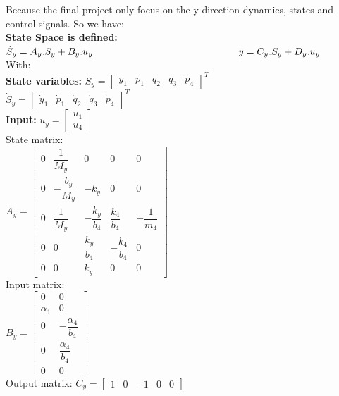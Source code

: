 \documentclass[14pt,a4paper]{article}
\begin{document}
\label{Problems}
\doublespacing
	Because the final project only focus on the y-direction dynamics, states and control signals. So we have:\\
	\textbf{State Space is defined:} \\
	\hspace*{5cm}	$\dot{S}_y = A_y.S_y + B_y.u_y \\
	\hspace*{5.2cm}		y = C_y.S_y + D_y.u_y $ \\
	With: \\
	\textbf{State variables:}  $S_y = {\begin{bmatrix} y_1&p_1&q_2&q_3&p_4 \end{bmatrix}}^T $ \\
	\hspace*{3.3cm} $\dot{S}_y = {\begin{bmatrix} \dot{y}_1 & \dot{p}_1 & \dot{q}_2 &\dot{q}_3 & \dot{p}_4 \end{bmatrix}}^T $ \\
	\textbf{Input:} $ u_y = \begin{bmatrix} u_1 \\ u_4 \end{bmatrix} $ \\
	State matrix:\\
	\hspace*{2cm} $ A_y = \begin{bmatrix} 0& \dfrac{1}{M_y} & 0&0&0 \\ 0& -\dfrac{b_y}{M_y} & -k_y&0&0 \\ 0& \dfrac{1}{M_y} & -\dfrac{k_y}{b_4} & \dfrac{k_4}{b_4} & -\dfrac{1}{m_4} \\ 0&0& \dfrac{k_y}{b_4} & -\dfrac{k_4}{b_4} &0 \\ 0&0& k_y &0&0 \end{bmatrix}$ \\
	Input matrix: \\
	\hspace*{2cm} $ B_y = \begin{bmatrix} 0&0 \\ \alpha_1 &0 \\ 0& -\dfrac{\alpha_4}{b_4} \\ 0& \dfrac{\alpha_4}{b_4} \\ 0&0 \end{bmatrix} $\\
	Output matrix: \hspace{1cm}	$ C_y = \begin{bmatrix} 1& 0& -1& 0& 0 \end{bmatrix} $ \\
\end{document}
